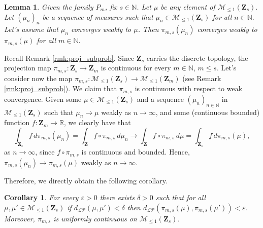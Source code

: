 \documentclass[12pt,twoside,a4paper]{article}
\newtheorem{corollary}{Corollary}[theorem]
\newtheorem{lemma}[theorem]{Lemma}
\def\N{\mathbb{N}}
\newcommand{\Space}{\mathbf{Z}}
\begin{document}
\begin{lemma}
Given the family $P_m$, fix $s\in \N$. Let $\mu$ be any element of $\mathcal{M}_{\leq 1}(\Space_s).$ Let $(\mu_n)_n$ be a sequence of measures such that $\mu_n\in \mathcal{M}_{\leq 1}(\Space_s)$ for all $n\in \mathbb{N}.$ Let's assume that $\mu_n$ converges weakly to $\mu$. Then $\pi_{m,s}(\mu_n)$ converges weakly to $\pi_{m,s}(\mu)$ for all $m\in \mathbb{N}.$ 
\end{lemma}
\proof
Recall Remark \ref{rmk:proj_subprob}. Since $\Space_s$ carries the discrete topology, the projection map $\pi_{m,s} : \Space_s \to \Space_m$ is continuous for every $m \in \mathbb{N}$, $m\leq s$. 
Let's consider now the map $\pi_{m,s} : \mathcal{M}_{\leq 1}(\Space_s) \to \mathcal{M}_{\leq 1}(\Space_m)$ (see Remark \ref{rmk:proj_subprob}). We claim that $\pi_{m,s}$ is continuous with respect to weak convergence. Given some $\mu \in \mathcal{M}_{\leq 1}(\Space_s)$ and a sequence $(\mu_n)_{n \in \mathbb{N}} $ in $\mathcal{M}_{\leq 1}(\Space_s)$ such that $\mu_n \to \mu$ weakly as $n \to \infty$, and some (continuous bounded) function $f : \Space_m \to \mathbb{R}$, we clearly have that
\[
\int_{\Space_{s}} f \, d\pi_{m,s}(\mu_n) = \int_{\Space} f \circ \pi_{m,s} \, d\mu_n \to \int_{\Space} f \circ \pi_{m,s} \, d\mu = \int_{\Space_{s}} f \, d\pi_{m,s}(\mu),
\]
as $n \to \infty$, since $f \circ \pi_{m,s}$ is continuous and bounded. Hence, $\pi_{m,s}(\mu_n) \to \pi_{m,s}(\mu)$ weakly as $n \to \infty$.
\endproof

Therefore, we directly obtain the following corollary.
\begin{corollary}\label{cor:ineqLevyProkProjSys}
For every $\varepsilon>0$ there exists $\delta>0$ such that for all $\mu,\mu'\in \mathcal{M}_{\leq1}(\Space_s)$ if $d_{\mathcal{LP}}(\mu,\mu')<\delta$ then $d_{\mathcal{LP}}(\pi_{m,s}(\mu),\pi_{m,s}(\mu'))<\varepsilon.$ Moreover, $\pi_{m,s}$ is uniformly continuous on $\mathcal{M}_{\leq 1}(\Space_s)$.
\end{corollary}
\end{document}

